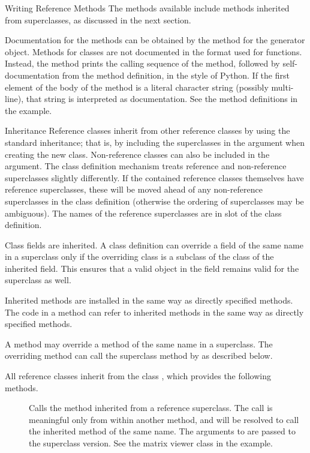 \begin{Section}{Writing Reference Methods}
The methods available include methods inherited from superclasses, as
discussed in the next section.

Documentation for the methods can be obtained by the  
method for the generator object.
Methods for classes are not documented in the  format used
for \R{} functions.
Instead, the  
method prints the calling sequence of the method, followed by
self-documentation from the method definition, in the style of Python.
If the first element of the body of the method is a literal character
string (possibly multi-line), that string is interpreted as documentation.
See the method definitions in the example.
\end{Section}
%
\begin{Section}{Inheritance}
Reference classes inherit from other reference classes by using the
standard \R{} inheritance; that is, by including the superclasses in the
 argument when creating the new class.
Non-reference classes can also be included in the  argument.  The class definition
mechanism treats reference and non-reference superclasses slightly differently.
If the contained reference classes themselves have reference
superclasses, these will be moved ahead of any non-reference
superclasses in the class definition (otherwise the ordering of
superclasses may be ambiguous).
The names of the reference superclasses are in slot
 of the class definition.

Class fields are inherited.  A class definition can override a field
of the same name in a superclass only if the overriding class is a
subclass of the class of the inherited field.  This ensures that a
valid object in the field remains valid for the superclass as well.

Inherited methods are installed in the same way as directly
specified methods.
The code in a method can refer to  inherited methods in the same
way as directly specified methods.

A method may override a method of the same name in a superclass.
The overriding method can call the superclass method by
 as described below.

All reference classes inherit from the class ,
which provides the following methods.

\begin{description}

\item[]  
Calls the method inherited from a reference superclass.
The call is meaningful only from within another method, and will be
resolved to call the inherited method of the same name.
The arguments to  
are passed to the superclass version.
See the matrix viewer class in the example.


\end{description}
\end{Section}
